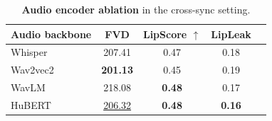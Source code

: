 \begin{table}[t]
\centering
\begin{tabular}{lcccc}
\toprule
Audio backbone     & FVD  & LipScore $\uparrow$ & LipLeak  \\ \midrule
Whisper~\cite{whisper}    &  207.41  &  0.47   &  0.18  \\
Wav2vec2~\cite{wav2vec2}         & \textbf{201.13}    & 0.45  & 0.19  \\ 
 WavLM~\cite{wavlm}    &  218.08   & \textbf{0.48}  & 0.17  \\
\rowcolor{Gray!40} HuBERT~\cite{hubert}        & \underline{206.32}    & \textbf{0.48}  & \textbf{0.16}  \\
\bottomrule
\end{tabular}
\caption{\textbf{Audio encoder ablation} in the cross-sync setting.}
\label{tab:abl_audio}
\end{table}
